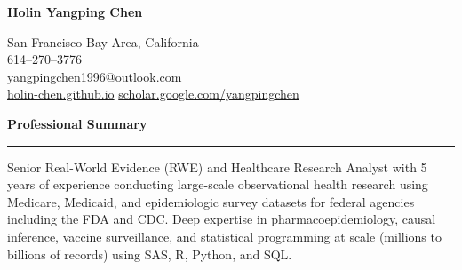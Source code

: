 \documentclass[10pt]{article}
\begin{document}

\noindent
\begin{minipage}[t]{0.55\textwidth}
    \vspace{5pt}
    
    {\Huge \textbf{Holin Yangping Chen}}
\end{minipage}
\hfill
\begin{minipage}[t]{0.42\textwidth}
    \raggedleft
    San Francisco Bay Area, California \\
    614--270--3776 \\
    \href{mailto:yangpingchen1996@outlook.com}{yangpingchen1996@outlook.com} \\
    \href{https://holin-chen.github.io/}{holin-chen.github.io}
    \href{https://scholar.google.com/citations?user=1KJ1nPgAAAAJ&hl=en}
    {scholar.google.com/yangpingchen}
\end{minipage}

\vspace{8pt}





\textbf{\textcolor{rBlue}{Professional Summary}}
\hrule


Senior Real-World Evidence (RWE) and Healthcare Research Analyst with 5 years of experience conducting large-scale observational health research using Medicare, Medicaid, and epidemiologic survey datasets for federal agencies including the FDA and CDC. Deep expertise in pharmacoepidemiology, causal inference, vaccine surveillance, and statistical programming at scale (millions to billions of records) using SAS, R, Python, and SQL. 
\end{document}
